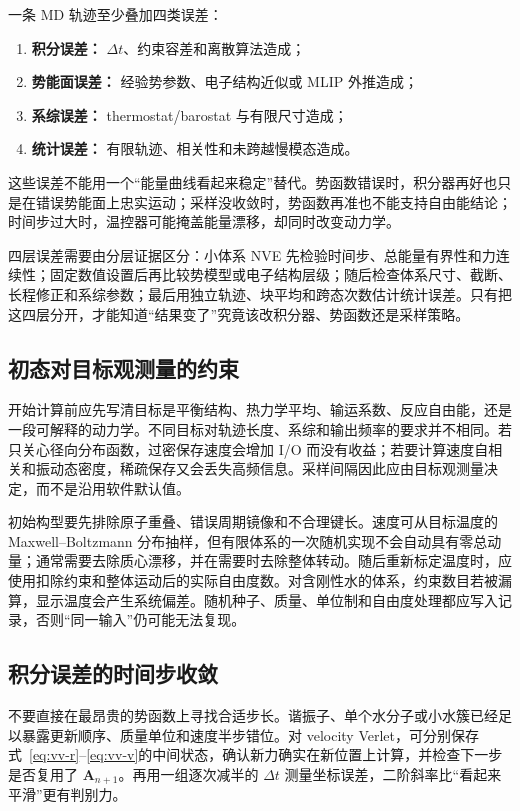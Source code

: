 \documentclass[UTF8,10pt,a4paper,fontset=none]{ctexart}
\begin{document}
一条 MD 轨迹至少叠加四类误差：
\begin{enumerate}
  \item \textbf{积分误差：} $\Delta t$、约束容差和离散算法造成；
  \item \textbf{势能面误差：} 经验势参数、电子结构近似或 MLIP 外推造成；
  \item \textbf{系综误差：} thermostat/barostat 与有限尺寸造成；
  \item \textbf{统计误差：} 有限轨迹、相关性和未跨越慢模态造成。
\end{enumerate}
这些误差不能用一个“能量曲线看起来稳定”替代。势函数错误时，积分器再好也只是在错误势能面上忠实运动；采样没收敛时，势函数再准也不能支持自由能结论；时间步过大时，温控器可能掩盖能量漂移，却同时改变动力学。

四层误差需要由分层证据区分：小体系 NVE 先检验时间步、总能量有界性和力连续性；固定数值设置后再比较势模型或电子结构层级；随后检查体系尺寸、截断、长程修正和系综参数；最后用独立轨迹、块平均和跨态次数估计统计误差。只有把这四层分开，才能知道“结果变了”究竟该改积分器、势函数还是采样策略。

\subsection{初态对目标观测量的约束}

开始计算前应先写清目标是平衡结构、热力学平均、输运系数、反应自由能，还是一段可解释的动力学。不同目标对轨迹长度、系综和输出频率的要求并不相同。若只关心径向分布函数，过密保存速度会增加 I/O 而没有收益；若要计算速度自相关和振动态密度，稀疏保存又会丢失高频信息。采样间隔因此应由目标观测量决定，而不是沿用软件默认值。

初始构型要先排除原子重叠、错误周期镜像和不合理键长。速度可从目标温度的 Maxwell--Boltzmann 分布抽样，但有限体系的一次随机实现不会自动具有零总动量；通常需要去除质心漂移，并在需要时去除整体转动。随后重新标定温度时，应使用扣除约束和整体运动后的实际自由度数。对含刚性水的体系，约束数目若被漏算，显示温度会产生系统偏差。随机种子、质量、单位制和自由度处理都应写入记录，否则“同一输入”仍可能无法复现。

\subsection{积分误差的时间步收敛}

不要直接在最昂贵的势函数上寻找合适步长。谐振子、单个水分子或小水簇已经足以暴露更新顺序、质量单位和速度半步错位。对 velocity Verlet，可分别保存式~\eqref{eq:vv-r}--\eqref{eq:vv-v}的中间状态，确认新力确实在新位置上计算，并检查下一步是否复用了 $\bm A_{n+1}$。再用一组逐次减半的 $\Delta t$ 测量坐标误差，二阶斜率比“看起来平滑”更有判别力\cite{swope1982,hairer2006}。
\end{document}
